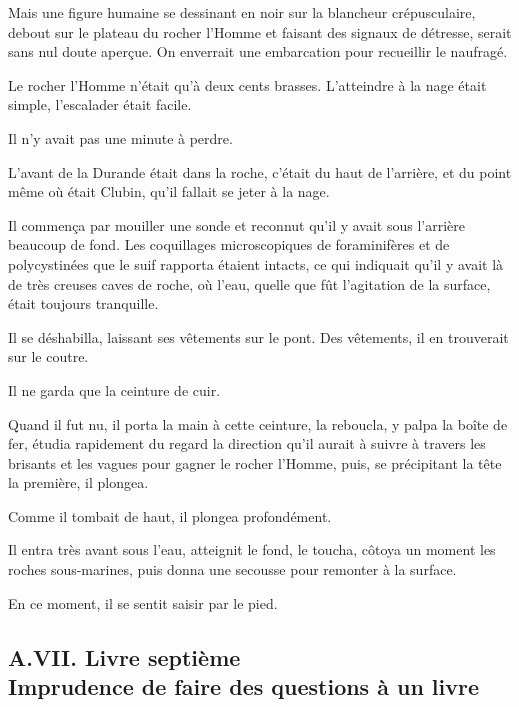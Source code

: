 \documentclass[french,twoside]{book} %
\begin{document}
Mais une figure humaine se dessinant en noir sur la blancheur crépusculaire, debout sur le plateau du rocher l’Homme et faisant des signaux de détresse, serait sans nul doute aperçue. On enverrait une embarcation pour recueillir le naufragé.\par
Le rocher l’Homme n’était qu’à deux cents brasses.  L’atteindre à la nage était simple, l’escalader était facile.\par
Il n’y avait pas une minute à perdre.\par
L’avant de la Durande était dans la roche, c’était du haut de l’arrière, et du point même où était Clubin, qu’il fallait se jeter à la nage.\par
Il commença par mouiller une sonde et reconnut qu’il y avait sous l’arrière beaucoup de fond. Les coquillages microscopiques de foraminifères et de polycystinées que le suif rapporta étaient intacts, ce qui indiquait qu’il y avait là de très creuses caves de roche, où l’eau, quelle que fût l’agitation de la surface, était toujours tranquille.\par
Il se déshabilla, laissant ses vêtements sur le pont. Des vêtements, il en trouverait sur le coutre.\par
Il ne garda que la ceinture de cuir.\par
Quand il fut nu, il porta la main à cette ceinture, la reboucla, y palpa la boîte de fer, étudia rapidement du regard la direction qu’il aurait à suivre à travers les brisants et les vagues pour gagner le rocher l’Homme, puis, se précipitant la tête la première, il plongea.\par
Comme il tombait de haut, il plongea profondément.\par
Il entra très avant sous l’eau, atteignit le fond, le toucha, côtoya un moment les roches sous-marines, puis donna une secousse pour remonter à la surface.\par
En ce moment, il se sentit saisir par le pied.
 \subsection[{A.VII. Livre septième. Imprudence de faire des questions à un livre}]{A.VII. Livre septième \\
Imprudence de faire des questions à un livre}
\end{document}
